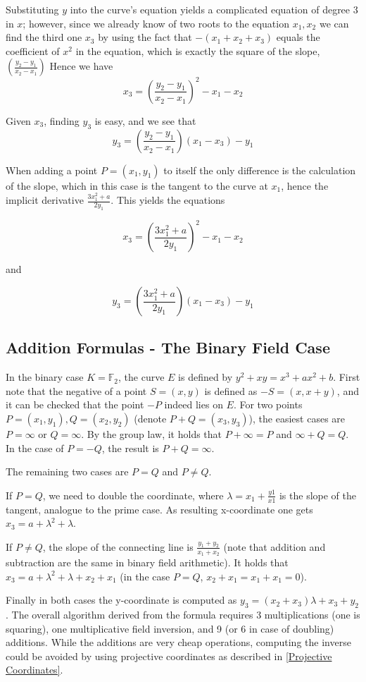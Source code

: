 \documentclass[11pt,english]{article}
\begin{document}
Substituting $y$ into the curve's equation yields a complicated equation of degree 3 in $x$; however, since we already know of two roots to the equation $x_1,x_2$
we can find the third one $x_3$ by using the fact that $-(x_1+x_2+x_3)$ equals the coefficient of $x^2$ in the equation, which is exactly the square of the slope, $\left(\frac{y_2-y_1}{x_2-x_1}\right)$ 
Hence we have $$x_3=\left(\frac{y_2-y_1}{x_2-x_1}\right)^2-x_1-x_2$$

Given $x_3$, finding $y_3$ is easy, and we see that $$y_3=\left(\frac{y_2-y_1}{x_2-x_1}\right)(x_1-x_3)-y_1$$

When adding a point $P=(x_1,y_1)$ to itself the only difference is the calculation of the slope, which in this case is the tangent to the curve at $x_1$, hence
the implicit derivative $\frac{3x_1^2+a}{2y_1}$. This yields the equations 

$$x_3=\left(\frac{3x_1^2+a}{2y_1}\right)^2-x_1-x_2$$

and

$$y_3=\left(\frac{3x_1^2+a}{2y_1}\right)(x_1-x_3)-y_1$$

\subsection{Addition Formulas - The Binary Field Case}
In the binary case $K=\mathbb{F}_2$, the curve $E$ is defined by $y^2+xy=x^3+ax^2+b$. First note that the negative of a point $S=(x,y)$ is defined as $-S=(x,x+y)$, and it can be checked that the point $-P$ indeed lies on $E$.
For two points $P=(x_1,y_1),Q=(x_2,y_2)$ (denote $P+Q=(x_3,y_3)$), the easiest cases are $P=\infty$ or $Q=\infty$. By the group law, it holds that $P+\infty=P$ and $\infty+Q=Q$. In the case of $P=-Q$, the result is $P+Q=\infty$.

The remaining two cases are $P=Q$ and $P\ne Q$.

If $P=Q$, we need to double the coordinate, where $\lambda=x_1+\frac{y1}{x1}$ is the slope of the tangent, analogue to the prime case. As resulting x-coordinate one gets $x_3=a+\lambda^2+\lambda$.

If $P\ne Q$, the slope of the connecting line is $\frac{y_1+y_2}{x_1+x_2}$ (note that addition and subtraction are the same in binary field arithmetic). It holds that $x_3=a+\lambda^2+\lambda+x_2+x_1$ (in the case $P=Q$, $x_2+x_1=x_1+x_1=0$).

Finally in both cases the y-coordinate is computed as $y_3=(x_2+x_3)\lambda+x_3+y_2$. The overall algorithm derived from the formula requires 3 multiplications (one is squaring), one multiplicative field inversion, and 9 (or 6 in case of doubling) additions. While the additions are very cheap operations, computing the inverse could be avoided by using projective coordinates as described in \ref{Projective Coordinates}.
\end{document}
